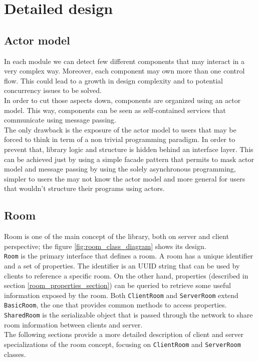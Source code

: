\chapter{Detailed design}

\section{Actor model}

In each module we can detect few different components that may interact in a very complex way. Moreover, each component may own more than one control flow. This could lead to a growth in design complexity and to potential concurrency issues to be solved.
\\
In order to cut those aspects down, components are organized using an actor model. This way, components can be seen as self-contained services that communicate using message passing.
\\
The only drawback is the exposure of the actor model to users that may be forced to think in term of a non trivial programming paradigm. In order to prevent that, library logic and structure is hidden behind an interface layer. This can be achieved just by using a simple facade pattern that permits to mask actor model and message passing by using the solely asynchronous programming, simpler to users the may not know the actor model and more general for users that wouldn't structure their programs using actors.

\section{Room}

Room is one of the main concept of the library, both on server and client perspective; the figure \ref{fig:room_class_diagram} shows its design.
\\
\texttt{Room} is the primary interface that defines a room. A room has a unique identifier and a set of properties. The identifier is an UUID string that can be used by clients to reference a specific room. On the other hand, properties (described in section \ref{room_properties_section}) can be queried to retrieve some useful information exposed by the room. 
Both \texttt{ClientRoom} and \texttt{ServerRoom} extend \texttt{BasicRoom}, the one that provides common methods to access properties.
 \\
\texttt{SharedRoom} is the serializable object that is passed through the network to share room information between clients and server. 
\\
The following sections provide a more detailed description of client and server specializations of the room concept, focusing on \texttt{ClientRoom} and \texttt{ServerRoom} classes.



